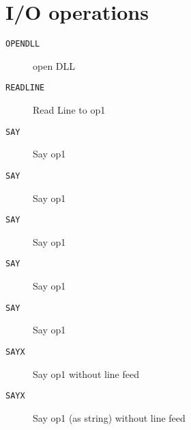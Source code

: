 \section{I/O operations}
\begin{description}
\item[\texttt{OPENDLL    }]  open DLL\\
\end{description}

\begin{description}
\item[\texttt{READLINE   }]  Read Line to op1\\
\end{description}

\begin{description}
\item[\texttt{SAY        }]  Say op1\\
\end{description}

\begin{description}
\item[\texttt{SAY        }]  Say op1\\
\end{description}

\begin{description}
\item[\texttt{SAY        }]  Say op1\\
\end{description}

\begin{description}
\item[\texttt{SAY        }]  Say op1\\
\end{description}

\begin{description}
\item[\texttt{SAY        }]  Say op1\\
\end{description}

\begin{description}
\item[\texttt{SAYX       }]  Say op1 without line feed\\
\end{description}

\begin{description}
\item[\texttt{SAYX       }]  Say op1 (as string) without line feed\\
\end{description}

